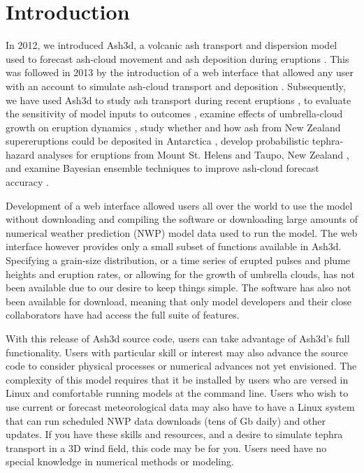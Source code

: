 \chapter{Introduction}\label{ChapIntro}
In 2012, we introduced Ash3d, a volcanic ash transport and dispersion model
used to forecast ash-cloud movement and ash deposition during eruptions \cite{Schwaiger2012}.
This was followed in 2013 by the introduction of a web interface that allowed any user
with an account to simulate ash-cloud transport and deposition \cite{Mastin2013b}.
Subsequently, we have used Ash3d to study ash transport during recent
eruptions \cite{Mastin2013a}, to evaluate the sensitivity of model inputs to
outcomes \cite{Mastin2016}, examine effects of umbrella-cloud growth on eruption
dynamics \cite{Mastin2014,Mastin2020a},  study whether and how ash from New Zealand
supereruptions could be deposited in Antarctica \cite{Dunbar2017}, develop
probabilistic tephra-hazard analyses for eruptions from Mount St. Helens \cite{Mastin2020b}
and Taupo, New Zealand \cite{Barker2019}, and examine Bayesian ensemble techniques
to improve ash-cloud forecast accuracy \cite{Denlinger2012}.

Development of a web interface allowed users all over the world to use the model
without downloading and compiling the software or downloading large amounts of
numerical weather prediction (NWP) model data used to run the model.  The web
interface however provides only a small subset of functions available in Ash3d.
Specifying a grain-size distribution, or a time series of erupted pulses and
plume heights and eruption rates, or allowing for the growth of umbrella clouds,
has not been available due to our desire to keep things simple.  The software has
also not been available for download, meaning that only model developers and their
close collaborators have had access the full suite of features.

With this release of Ash3d source code, users can take advantage of Ash3d's full
functionality.  Users with particular skill or interest may also advance the
source code to consider physical processes or numerical advances not yet envisioned.
The complexity of this model requires that it be installed by users who are versed
in Linux and comfortable running models at the command line.  Users who wish to use
current or forecast meteorological data may also have to have a Linux system that
can run scheduled NWP data downloads (tens of Gb daily) and other updates.  If you
have these skills and resources, and a desire to simulate tephra transport in a 3D
wind field, this code may be for you. Users need have no special knowledge in
numerical methods or modeling.

